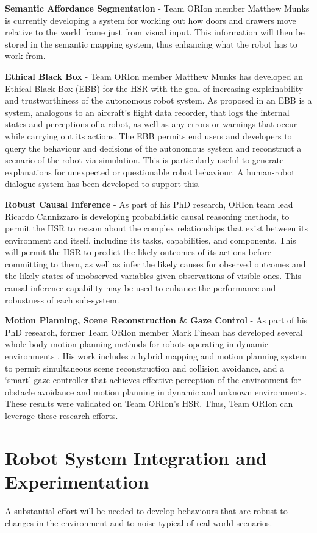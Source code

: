 \documentclass[runningheads,a4paper]{llncs}
\newcommand{\teamori}{Team ORIon}
\begin{document}
\textbf{Semantic Affordance Segmentation} - \teamori{} member Matthew Munks is currently developing a system for working out how doors and drawers move relative to the world frame just from visual input. This information will then be stored in the semantic mapping system, thus enhancing what the robot has to work from.

\textbf{Ethical Black Box} - \teamori{} member Matthew Munks has developed an Ethical Black Box (EBB) for the HSR with the goal of increasing explainability and trustworthiness of the autonomous robot system. As proposed in \cite{winfield2017} an EBB is a system, analogous to an aircraft's flight data recorder, that logs the internal states and perceptions of a robot, as well as any errors or warnings that occur while carrying out its actions. The EBB permits end users and developers to query the behaviour and decisions of the autonomous system and reconstruct a scenario of the robot via simulation. This is particularly useful to generate explanations for unexpected or questionable robot behaviour. A human-robot dialogue system has been developed to support this.

\textbf{Robust Causal Inference} - As part of his PhD research, ORIon team lead Ricardo Cannizzaro is developing probabilistic causal reasoning methods, to permit the HSR to reason about the complex relationships that exist between its environment and itself, including its tasks, capabilities, and components. This will permit the HSR to predict the likely outcomes of its actions before committing to them, as well as infer the likely causes for observed outcomes and the likely states of unobserved variables given observations of visible ones. This causal inference capability may be used to enhance the performance and robustness of each sub-system.

\textbf{Motion Planning, Scene Reconstruction \& Gaze Control} - As part of his PhD research, former \teamori{} member Mark Finean has developed several whole-body motion planning methods for robots operating in dynamic environments \cite{finean2021simultaneous,finean2021i}. His work includes a hybrid mapping and motion planning system to permit simultaneous scene reconstruction and collision avoidance, and a `smart' gaze controller that achieves effective perception of the environment for obstacle avoidance and motion planning in dynamic and unknown environments. These results were validated on \teamori{}'s HSR. Thus, \teamori{} can leverage these research efforts.

\section{Robot System Integration and Experimentation}
A substantial effort will be needed to develop behaviours that are robust to
changes in the environment and to noise typical of real-world scenarios.
\end{document}
